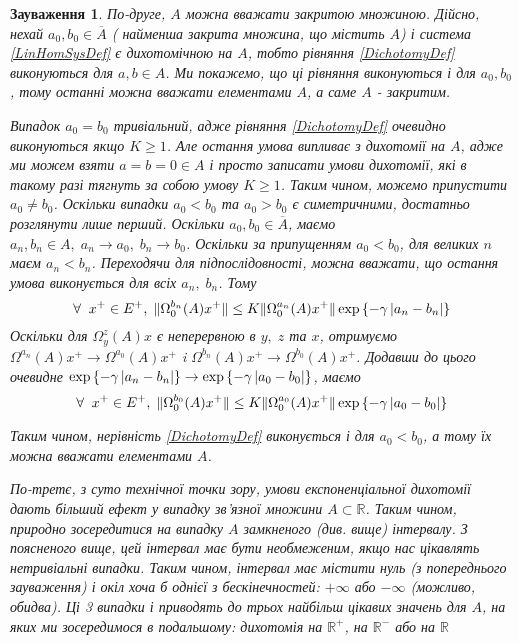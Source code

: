 \documentclass[14pt]{extarticle} %
\let\oldforall\forall
\renewcommand{\forall}{\oldforall\;}
\newtheorem{remark}{Зауваження}
\begin{document}
\begin{remark}
	По-друге, $A$ можна вважати закритою множиною. Дійсно, нехай $a_0,b_0\in\overline{A}$ (
	найменша закрита множина, що містить $A$) і система \ref{LinHomSysDef} є дихотомічною на $A$,
	тобто рівняння \ref{DichotomyDef} виконуються для $a,b\in A$. Ми покажемо, що ці рівняння виконуються і для $a_0,b_0$, тому останні можна
	вважати елементами $A$, а саме $A$ - закритим.

	Випадок $a_0=b_0$ тривіальний, адже рівняння \ref{DichotomyDef} очевидно виконуються якщо $K\geq 1$. Але остання умова випливає з дихотомії
	на $A$, адже ми можем взяти $a=b=0\in A$ і просто записати умови дихотомії, які в такому разі тягнуть за собою умову $K\geq 1$. Таким чином,
	можемо припустити $a_0\neq b_0$. Оскільки випадки $a_0<b_0$ та $a_0>b_0$ є симетричними, достатньо розглянути лише перший. Оскільки $a_0,
	b_0\in\overline{A}$, маємо $a_n,b_n\in A,\; a_n\to a_0,\;b_n\to b_0$. Оскільки за припущенням $a_0<b_0$, для великих $n$ маєм
	$a_n<b_n$. Переходячи для підпослідовності, можна вважати, що остання умова виконується для всіх $a_n,\;b_n$. Тому
	\[\forall x^+\in E^+,\;\mynorm{\Omega^{b_n}_0(A)x^+}\leq K\mynorm{\Omega_0^{a_n}(A)x^+}\exp\left\{-\gamma\myabs{a_n-b_n}\right\}\]
	Оскільки для $\Omega_y^z(A)x$ є неперервною в $y,\;z$ та $x$, отримуємо $\Omega^{a_n}(A)x^+\to\Omega^{a_0}(A)x^+$ i
	$\Omega^{b_n}(A)x^+\to\Omega^{b_0}(A)x^+$. Додавши до цього очевидне $\exp\left\{-\gamma\left|a_n-b_n\right|\right\}\to
	\exp\left\{-\gamma\left|a_0-b_0\right|\right\}$, маємо
	\[\forall x^+\in E^+,\;\mynorm{\Omega^{b_0}_0(A)x^+}\leq K\mynorm{\Omega_0^{a_0}(A)x^+}\exp\left\{-\gamma\myabs{a_0-b_0}\right\}\]

	Таким чином, нерівність \ref{DichotomyDef} виконується і для $a_0< b_0$, а тому їх можна вважати елементами $A$.

	По-третє, з суто технічної точки зору, умови експоненціальної дихотомії дають більший ефект у випадку зв’язної множини $A\subset\mathbb{R}$.
	Таким чином, природно зосередитися на випадку $A$ замкненого (див. вище) інтервалу. З поясненого вище, цей інтервал має бути необмеженим,
	якщо нас цікавлять нетривіальні випадки. Таким чином, інтервал має містити нуль (з попереднього зауваження) і окіл хоча б однієї
	з бескінечностей: $+\infty$ або $-\infty$ (можливо, обидва). Ці 3 випадки і приводять до трьох найбільш цікавих значень для $A$, на
	яких ми зосередимося в подальшому: дихотомія на $\mathbb{R}^+$, на $\mathbb{R}^-$ або на $\mathbb{R}$
\end{remark}
\end{document}
